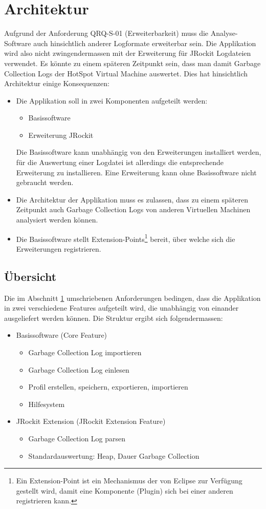 \section{Architektur}\label{konzept_uebersicht}
Aufgrund der Anforderung QRQ-S-01 (Erweiterbarkeit) muss die Analyse-Software auch hinsichtlich anderer Logformate erweiterbar sein. Die Applikation wird also nicht zwingendermassen mit der Erweiterung für JRockit Logdateien verwendet. Es könnte zu einem späteren Zeitpunkt sein, dass man damit Garbage Collection Logs der HotSpot Virtual Machine auswertet. Dies hat hinsichtlich Architektur einige Konsequenzen:
\begin{itemize}
	\item Die Applikation soll in zwei Komponenten aufgeteilt werden:
		\begin{itemize}
			\item Basissoftware
			\item Erweiterung JRockit
		\end{itemize}
		Die Basissoftware kann unabhängig von den Erweiterungen installiert werden, für die Auswertung einer Logdatei ist allerdings die entsprechende Erweiterung zu installieren. Eine Erweiterung kann ohne Basissoftware nicht gebraucht werden.
	\item Die Architektur der Applikation muss es zulassen, dass zu einem späteren Zeitpunkt auch Garbage Collection Logs von anderen Virtuellen Machinen analysiert werden können.
	\item Die Basissoftware stellt Extension-Points\footnote{Ein Extension-Point ist ein Mechanismus der von Eclipse zur Verfügung gestellt wird, damit eine Komponente (Plugin) sich bei einer anderen registrieren kann.} bereit, über welche sich die Erweiterungen  registrieren.
\end{itemize}

\subsection{Übersicht}
Die im Abschnitt \ref{konzept_uebersicht} umschriebenen Anforderungen bedingen, dass die Applikation in zwei verschiedene Features aufgeteilt wird, die unabhängig von einander ausgeliefert werden können. Die Struktur ergibt sich folgendermassen:
\begin{itemize}
	\item Basissoftware (Core Feature)
		\begin{itemize}
			\item Garbage Collection Log importieren
			\item Garbage Collection Log einlesen
			\item Profil erstellen, speichern, exportieren, importieren
			\item Hilfesystem
		\end{itemize}
	\item JRockit Extension (JRockit Extension Feature)
		\begin{itemize}
			\item Garbage Collection Log parsen
			\item Standardauswertung: Heap, Dauer Garbage Collection
		\end{itemize}
\end{itemize}

